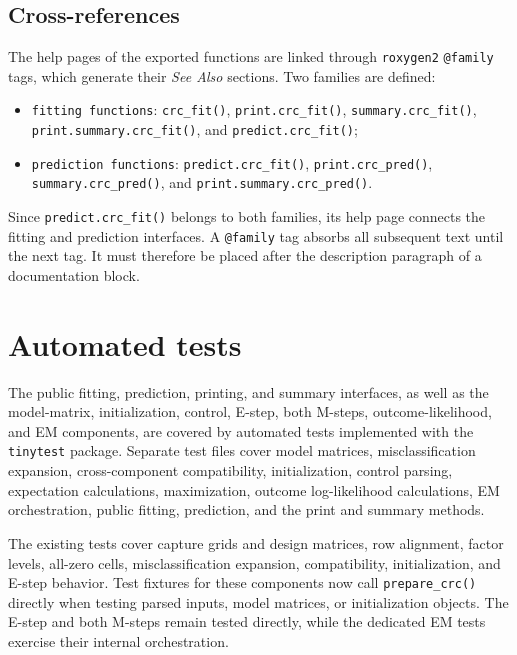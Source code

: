 \documentclass[11pt,letterpaper]{article}
\begin{document}
\subsection{Cross-references}

The help pages of the exported functions are linked through
\texttt{roxygen2} \texttt{@family} tags, which generate their \emph{See Also}
sections. Two families are defined:

{\raggedright
\begin{itemize}
  \item \texttt{fitting functions}: \texttt{crc\_fit()},
  \texttt{print.crc\_fit()}, \texttt{summary.crc\_fit()},
  \texttt{print.summary.crc\_fit()}, and \texttt{predict.crc\_fit()};
  \item \texttt{prediction functions}: \texttt{predict.crc\_fit()},
  \texttt{print.crc\_pred()}, \texttt{summary.crc\_pred()}, and
  \texttt{print.summary.crc\_pred()}.
\end{itemize}
\par}

Since \texttt{predict.crc\_fit()} belongs to both families, its help page
connects the fitting and prediction interfaces. A \texttt{@family} tag absorbs
all subsequent text until the next tag. It must therefore be placed after the
description paragraph of a documentation block.

\section{Automated tests}

The public fitting, prediction, printing, and summary interfaces, as well as
the model-matrix, initialization, control, E-step, both M-steps,
outcome-likelihood, and EM components, are covered by automated tests
implemented with the \texttt{tinytest} package. Separate test files cover
model matrices, misclassification expansion, cross-component compatibility,
initialization, control parsing, expectation calculations, maximization,
outcome log-likelihood calculations, EM orchestration, public fitting,
prediction, and the print and summary methods.

The existing tests cover capture grids and design matrices, row alignment,
factor levels, all-zero cells, misclassification expansion, compatibility,
initialization, and E-step behavior. Test fixtures for these components now
call \texttt{prepare\_crc()} directly when testing parsed inputs, model
matrices, or initialization objects. The E-step and both M-steps remain tested
directly, while the dedicated EM tests exercise their internal orchestration.
\end{document}
